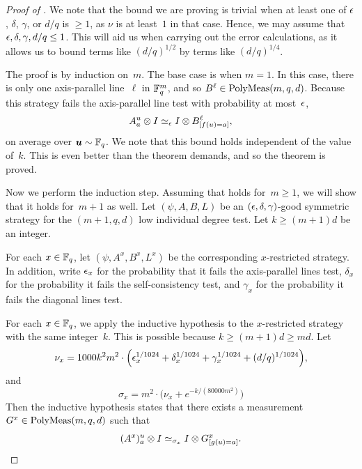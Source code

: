 \begin{proof}[Proof of ]
We note that the bound we are proving is trivial when at least one of $\epsilon$, $\delta$, $\gamma$,  or $d/q$ is $\geq 1$, as $\nu$ is at least~$1$ in that case. Hence, we may assume that $\epsilon, \delta, \gamma, d/q \leq 1$. This will aid us when carrying out the error calculations, as it allows us to bound terms like $(d/q)^{1/2}$ by terms like $(d/q)^{1/4}$.

The proof is by induction on~$m$.
The base case is when $m = 1$.
In this case, there is only one axis-parallel line~$\ell$ in $\mathbb F_q^m$,
and so $B^\ell \in \mathrm{PolyMeas}(m, q, d)$.
Because this strategy fails the axis-parallel line test with probability at most~$\epsilon$,
\begin{equation*}
A^u_a \otimes I \simeq_{\epsilon} I \otimes B^\ell_{[f(u) = a]},
\end{equation*}
on average over $\boldsymbol{u} \sim \mathbb F_q$.
We note that this bound holds independent of the value of~$k$.
This is even better than the theorem demands, and so the theorem is proved.

Now we perform the induction step.
Assuming that  holds for~$m \geq 1$,
we will show that it holds for~$m+1$ as well.
Let $(\psi, A, B, L)$ be an $(\epsilon, \delta, \gamma)$-good symmetric strategy
			for the $(m+1,q,d)$ low individual degree test.
Let $k \geq (m+1)d$ be an integer.

For each $x \in \mathbb F_q$, let $(\psi, A^x, B^x, L^x)$ be the corresponding $x$-restricted strategy.
In addition, write $\epsilon_x$ for the probability that it fails the axis-parallel lines test,
$\delta_x$ for the probability it fails the self-consistency test,
and $\gamma_x$ for the probability it fails the diagonal lines test.

For each $x \in \mathbb F_q$, we apply the inductive hypothesis to the $x$-restricted strategy with the same integer~$k$.
This is possible because $k \geq (m+1)d \geq md$.
Let
\begin{equation*}
\nu_x = 1000k^2 m^2 \cdot\Big(\epsilon_x^{1/1024} + \delta_x^{1/1024} + \gamma_x^{1/1024} + (d/q)^{1/1024}\Big),
\end{equation*}
and
\begin{equation*}
\sigma_x =  m^2 \cdot\Big(\nu_x + e^{- k/(80000m^2)}\Big)
\end{equation*}
Then the inductive hypothesis states that there exists a measurement $G^x \in \mathrm{PolyMeas}(m, q, d)$ such that
\begin{equation*}
(A^x)^u_a\otimes I \simeq_{\sigma_x} I \otimes G^x_{[g(u)=a]}.
\end{equation*}


\end{proof}

